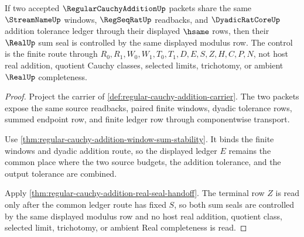 \begin{theorem}
\label{thm:regular-cauchy-addition-uniform-modulus}
If two accepted $\RegularCauchyAdditionUp$ packets share the same $\StreamNameUp$ windows, $\RegSeqRatUp$ readbacks, and $\DyadicRatCoreUp$ addition tolerance ledger through their displayed $\hsame$ rows, then their $\RealUp$ sum seal is controlled by the same displayed modulus row. The control is the finite route through $R_0,R_1,W_0,W_1,T_0,T_1,D,E,S,Z,H,C,P,N$, not host real addition, quotient Cauchy classes, selected limits, trichotomy, or ambient $\RealUp$ completeness.
\end{theorem}
\begin{proof}
Project the carrier of \autoref{def:regular-cauchy-addition-carrier}. The two packets expose the same source readbacks, paired finite windows, dyadic tolerance rows, summed endpoint row, and finite ledger row through componentwise transport.

Use \autoref{thm:regular-cauchy-addition-window-sum-stability}. It binds the finite windows and dyadic addition route, so the displayed ledger $E$ remains the common place where the two source budgets, the addition tolerance, and the output tolerance are combined.

Apply \autoref{thm:regular-cauchy-addition-real-seal-handoff}. The terminal row $Z$ is read only after the common ledger route has fixed $S$, so both sum seals are controlled by the same displayed modulus row and no host real addition, quotient class, selected limit, trichotomy, or ambient Real completeness is read.
\end{proof}

